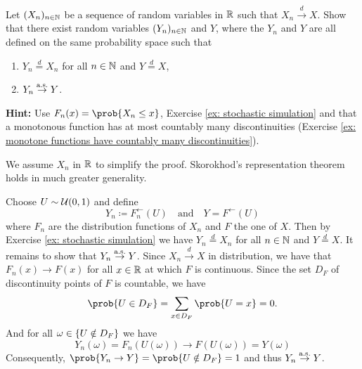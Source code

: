 \begin{exercise}
    \label{ex: skorokhod representation}
    Let \((X_n)_{n \in \mathbb{N}}\) be a sequence of random variables in \(\mathbb{R}\)
    such that \(X_n \xrightarrow{d} X\). Show that there exist random variables
    \((Y_n)_{n\in \mathbb{N}}\) and \(Y\), where the \(Y_n\) and \(Y\) are all defined on the
    same probability space such that
    \begin{enumerate}[label=(\roman*), noitemsep]
        \item \(Y_n \overset{d}= X_n\) for all \(n\in \mathbb{N}\) and \(Y \overset{d}= X\),
        \item \(Y_n \overset{\operatorname{\text{a.s.}}}\to Y\).
    \end{enumerate}
    \textbf{Hint:} Use \(F_n(x) = \prob{X_n \le x}\), Exercise \ref{ex:
    stochastic simulation} and that a monotonous function has at most countably
    many discontinuities (Exercise \ref{ex: monotone functions have countably
    many discontinuities}).
    \begin{remark}
        We assume \(X_n\) in \(\mathbb{R}\) to simplify the proof. Skorokhod's representation 
        theorem holds in much greater generality.
    \end{remark}
    \begin{solution}
        Choose \(U\sim \mathcal{U}(0,1)\) and define
        \[
            Y_n \coloneq F_n^{\leftarrow}(U)
            \quad \text{and}\quad
            Y = F^{\leftarrow}(U)
        \] where \(F_n\) are the distribution functions of \(X_n\) and \(F\) the
        one of \(X\). Then by Exercise \ref{ex: stochastic simulation} we have
        \(Y_n \overset{d}= X_n\) for all \(n\in \mathbb{N}\) and
        \(Y \overset{d}= X\).  It remains to show that \(Y_n \overset{\operatorname{\text{a.s.}}}\to
        Y\). Since \(X_n \overset{d}\to X\) in distribution, we have that
        \(F_n(x) \to F(x)\) for all \(x\in \mathbb{R}\) at which \(F\) is continuous.
        Since the set \(D_F\) of discontinuity points of \(F\) is countable, we have
        \[
            \prob{U \in D_F} = \sum_{x\in D_F}\prob{U = x} = 0.
        \]
        And for all \(\omega \in \{U \notin D_F\}\) we have
        \[
            Y_n(\omega) = F_n(U(\omega)) \to F(U(\omega))=Y(\omega)
        \]
        Consequently, \(\prob{ Y_n \to Y } = \prob{U \notin D_F} = 1\) and thus \(Y_n \overset{\operatorname{\text{a.s.}}}\to Y\).
    \end{solution}
\end{exercise}

